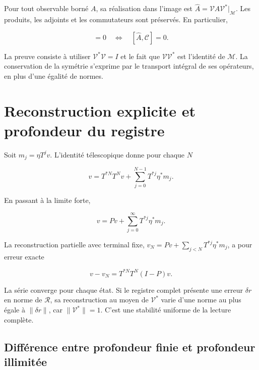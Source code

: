\begin{corollary}
Pour tout observable borné \(A\), sa réalisation dans l’image est \(\widehat A=\mathcal V A\mathcal V^*|_{\mathcal M}\). Les produits, les adjoints et les commutateurs sont préservés. En particulier,

\begin{equation}
[A,C]=0\quad\Longleftrightarrow\quad[\widehat A,\mathcal C]=0.
\label{x_reciprocidad:nuc03:eq:7}
\end{equation}
\end{corollary}

La preuve consiste à utiliser \(\mathcal V^*\mathcal V=I\) et le fait que \(\mathcal V\mathcal V^*\) est l’identité de \(\mathcal M\). La conservation de la symétrie s’exprime par le transport intégral de ses opérateurs, en plus d’une égalité de normes.

\section{Reconstruction explicite et profondeur du registre}

Soit \(m_j=\eta T^jv\). L’identité télescopique donne pour chaque \(N\)

\begin{equation}
\boxed{v=T^{*N}T^Nv+\sum_{j=0}^{N-1}T^{*j}\eta^*m_j.}
\label{x_reciprocidad:nuc03:eq:8}
\end{equation}

En passant à la limite forte,

\begin{equation}
\boxed{v=Pv+\sum_{j=0}^{\infty}T^{*j}\eta^*m_j.}
\label{x_reciprocidad:nuc03:eq:9}
\end{equation}

La reconstruction partielle avec terminal fixe,
\(v_N=Pv+\sum_{j<N}T^{*j}\eta^*m_j\), a pour erreur exacte

\begin{equation}
v-v_N=T^{*N}T^N(I-P)v.
\label{x_reciprocidad:nuc03:eq:10}
\end{equation}

La série converge pour chaque état. Si le registre complet présente une erreur \(\delta r\) en norme de \(\mathcal R\), sa reconstruction au moyen de \(\mathcal V^*\) varie d’une norme au plus égale à \(\|\delta r\|\), car \(\|\mathcal V^*\|=1\). C’est une stabilité uniforme de la lecture complète.

\subsection{Différence entre profondeur finie et profondeur illimitée}

